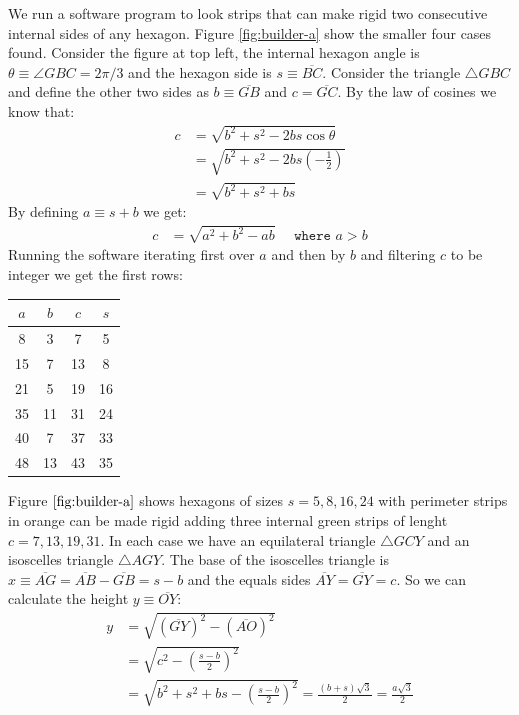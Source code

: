 \documentclass[11pt]{article}
\begin{document}
We run a software program to look strips that can make rigid two consecutive internal sides of any hexagon. Figure \ref{fig:builder-a} show the smaller four cases found. Consider the figure at top left, the internal hexagon angle is $\theta \equiv \angle{GBC} = 2\pi/3$ and the hexagon side is $s \equiv \overline{BC}$. Consider the triangle $\triangle{GBC}$ and define the other two sides as $b \equiv \overline{GB}$ and $c = \overline{GC}$. By the law of cosines we know that:
\begin{align}
c &= \sqrt{b^2 + s^2 - 2bs\cos\theta} \nonumber\\
 &= \sqrt{b^2 + s^2 - 2bs\left(-\frac{1}{2}\right)} \nonumber\\
 &= \sqrt{b^2 + s^2 + bs}
\end{align}
By defining $a \equiv s + b$ we get:
\begin{align}
c &= \sqrt{a^2 + b^2 - ab} \quad \texttt{ where } a > b
\end{align}
Running the software iterating first over $a$ and then by $b$ and filtering $c$ to be integer we get the first rows:
\begin{center}
\begin{tabular}{||c c c c||} 
 \hline
 $a$ & $b$ & $c$ & $s$ \\ [0.5ex] 
 \hline\hline
  8 &  3 &  7 &  5 \\ \hline
 15 &  7 & 13 &  8 \\ \hline
 21 &  5 & 19 & 16 \\ \hline
 35 & 11 & 31 & 24 \\ \hline
 40 &  7 & 37 & 33 \\ \hline
 48 & 13 & 43 & 35 \\ [1ex] 
 \hline
\end{tabular}
\end{center}

Figure $\ref{fig:builder-a}$ shows hexagons of sizes $s=5,8,16,24$ with perimeter strips in orange can be made rigid adding three internal green strips of lenght $c = 7,13,19,31$. In each case we have an equilateral triangle $\triangle{GCY}$ and an isoscelles triangle $\triangle{AGY}$. The base of the isoscelles triangle is $x \equiv \overline{AG} = \overline{AB} - \overline{GB} = s - b$ and the equals sides $\overline{AY} = \overline{GY} = c$. So we can calculate the height $y \equiv \overline{OY}$:
\begin{align}
y &= \sqrt{(\overline{GY})^2 - (\overline{AO})^2} \nonumber\\
 &= \sqrt{c^2 - \left(\frac{s-b}2\right)^2} \nonumber\\
 &= \sqrt{b^2 + s^2 + bs - \left(\frac{s-b}2\right)^2} = \frac{(b+s)\sqrt3}2 = \frac{a\sqrt3}2
\end{align}
\end{document}
